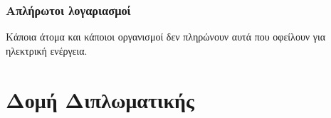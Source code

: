 \subsubsection{Απλήρωτοι λογαριασμοί}
Κάποια άτομα και κάποιοι οργανισμοί δεν πληρώνουν αυτά που οφείλουν για ηλεκτρική ενέργεια. 
\section{Δομή Διπλωματικής}